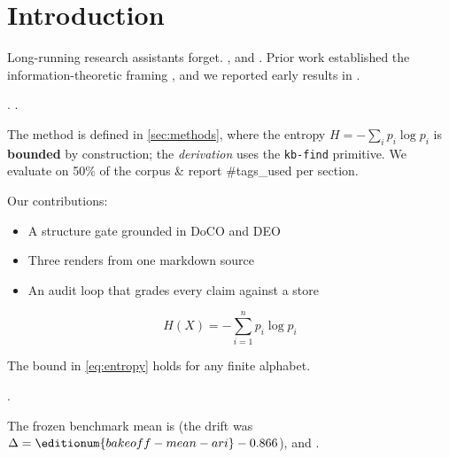 
\section{Introduction}\label{sec:introduction}

Long-running research assistants forget. , and . Prior work established the information-theoretic framing \cite{shannon1948,vaswani2017}, and we reported early results in .

. .

The method is defined in \cref{sec:methods}, where the entropy $H = -\sum_i p_i \log p_i$ is \textbf{bounded} by construction; the \emph{derivation} uses the \texttt{kb-find} primitive. We evaluate on 50\% of the corpus \& report \#tags\_used per section.

Our contributions:

\begin{itemize}
  \item A structure gate grounded in DoCO and DEO
  \item Three renders from one markdown source
  \item An audit loop that grades every claim against a store
\end{itemize}

\begin{equation}\label{eq:entropy}
  H(X) = -\sum_{i=1}^{n} p_i \log p_i
\end{equation}

The bound in \cref{eq:entropy} holds for any finite alphabet.

.

The frozen benchmark mean is  (the drift was $\Delta = \editionum{bakeoff-mean-ari} - 0.866$), and .

